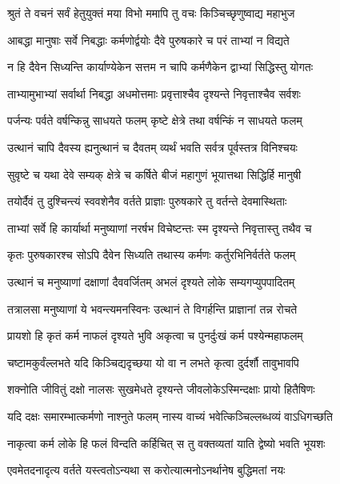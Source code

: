 \twolineshloka
{श्रुतं ते वचनं सर्वं हेतुयुक्तं मया विभो}
{ममापि तु वचः किञ्चिच्छृणुष्वाद्य महाभुज}


\twolineshloka
{आबद्धा मानुषाः सर्वे निबद्धाः कर्मणोर्द्वयोः}
{दैवे पुरुषकारे च परं ताभ्यां न विद्यते}


\twolineshloka
{न हि दैवेन सिध्यन्ति कार्याण्येकेन सत्तम}
{न चापि कर्मणैकेन द्वाभ्यां सिद्धिस्तु योगतः}


\twolineshloka
{ताभ्यामुभाभ्यां सर्वार्था निबद्धा अधमोत्तमाः}
{प्रवृत्ताश्चैव दृश्यन्ते निवृत्ताश्चैव सर्वशः}


\twolineshloka
{पर्जन्यः पर्वते वर्षन्किन्नु साधयते फलम्}
{कृष्टे क्षेत्रे तथा वर्षन्किं न साधयते फलम्}


\twolineshloka
{उत्थानं चापि दैवस्य ह्यनुत्थानं च दैवतम्}
{व्यर्थं भवति सर्वत्र पूर्वस्तत्र विनिश्चयः}


\twolineshloka
{सुवृष्टे च यथा देवे सम्यक् क्षेत्रे च कर्षिते}
{बीजं महागुणं भूयात्तथा सिद्धिर्हि मानुषी}


\twolineshloka
{तयोर्दैवं तु दुश्चिन्त्यं स्ववशेनैव वर्तते}
{प्राज्ञाः पुरुषकारे तु वर्तन्ते देवमास्थिताः}


\twolineshloka
{ताभ्यां सर्वे हि कार्यार्था मनुष्याणां नरर्षभ}
{विचेष्टन्तः स्म दृश्यन्ते निवृत्तास्तु तथैव च}


\twolineshloka
{कृतः पुरुषकारश्च सोऽपि दैवेन सिध्यति}
{तथास्य कर्मणः कर्तुरभिनिर्वर्तते फलम्}


\twolineshloka
{उत्थानं च मनुष्याणां दक्षाणां दैववर्जितम्}
{अभलं दृश्यते लोके सम्यगप्युपपादितम्}


\twolineshloka
{तत्रालसा मनुष्याणां ये भवन्त्यमनस्विनः}
{उत्थानं ते विगर्हन्ति प्राज्ञानां तन्न रोचते}


\twolineshloka
{प्रायशो हि कृतं कर्म नाफलं दृश्यते भुवि}
{अकृत्वा च पुनर्दुःखं कर्म पश्येन्महाफलम्}


\twolineshloka
{चष्टामकुर्वंल्लभते यदि किञ्चिद्यदृच्छया}
{यो वा न लभते कृत्वा दुर्दर्शौ तावुभावपि}


\twolineshloka
{शक्नोति जीवितुं दक्षो नालसः सुखमेधते}
{दृश्यन्ते जीवलोकेऽस्मिन्दक्षाः प्रायो हितैषिणः}


\twolineshloka
{यदि दक्षः समारम्भात्कर्मणो नाश्नुते फलम्}
{नास्य वाच्यं भवेत्किञ्चिल्लब्धव्यं वाऽधिगच्छति}


\twolineshloka
{नाकृत्वा कर्म लोके हि फलं विन्दति कर्हिचित्}
{स तु वक्तव्यतां याति द्वेष्यो भवति भूयशः}


\twolineshloka
{एवमेतदनादृत्य वर्तते यस्त्वतोऽन्यथा}
{स करोत्यात्मनोऽनर्थानेष बुद्धिमतां नयः}


